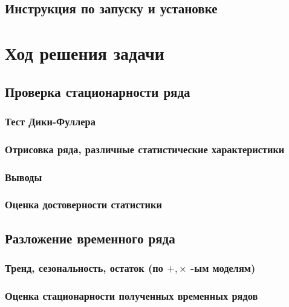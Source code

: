 \documentclass{article}
\begin{document}
  \subsection{Инструкция по запуску и установке}
  
\newpage  
  
\section{Ход решения задачи}

  \subsection{Проверка стационарности ряда}
    
    \subsubsection{Тест Дики-Фуллера}
    
    \subsubsection{Отрисовка ряда, различные статистические характеристики}
    
    \subsubsection{Выводы}
    
    \subsubsection{Оценка достоверности статистики}
  
  \newpage
    
  \subsection{Разложение временного ряда}
    
    \subsubsection{Тренд, сезональность, остаток (по $+, \times$ -ым моделям)} 
    
    \subsubsection{Оценка стационарности полученных временных рядов}
    
\end{document}
